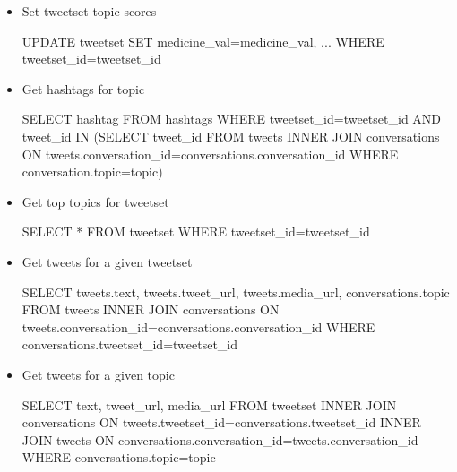 \begin{itemize}
    \item Set tweetset topic scores
    \begin{algorithm}
        \begin{algorithmic}
            \STATE UPDATE tweetset SET medicine\_val=medicine\_val, ... WHERE tweetset\_id=tweetset\_id
        \end{algorithmic}
    \end{algorithm}
\end{itemize}
\newpage
\begin{itemize}
    \item Get hashtags for topic
    \begin{algorithm}
        \begin{algorithmic}
            \STATE SELECT hashtag FROM hashtags WHERE tweetset\_id=tweetset\_id AND tweet\_id IN (SELECT tweet\_id FROM tweets INNER JOIN conversations ON tweets.conversation\_id=conversations.conversation\_id WHERE conversation.topic=topic)
        \end{algorithmic}
    \end{algorithm}
\end{itemize}

\begin{itemize}
    \item Get top topics for tweetset
    \begin{algorithm}
        \begin{algorithmic}
            \STATE SELECT * FROM tweetset WHERE tweetset\_id=tweetset\_id
        \end{algorithmic}
    \end{algorithm}
\end{itemize}

\begin{itemize}
    \item Get tweets for a given tweetset
    \begin{algorithm}
        \begin{algorithmic}
            \STATE SELECT tweets.text, tweets.tweet\_url, tweets.media\_url, conversations.topic FROM tweets INNER JOIN conversations ON tweets.conversation\_id=conversations.conversation\_id WHERE conversations.tweetset\_id=tweetset\_id
        \end{algorithmic}
    \end{algorithm}
\end{itemize}
\newpage
\begin{itemize}
    \item Get tweets for a given topic
    \begin{algorithm}
        \begin{algorithmic}
            \STATE SELECT text, tweet\_url, media\_url FROM tweetset INNER JOIN conversations ON tweets.tweetset\_id=conversations.tweetset\_id INNER JOIN tweets ON conversations.conversation\_id=tweets.conversation\_id WHERE conversations.topic=topic
        \end{algorithmic}
    \end{algorithm}
\end{itemize}